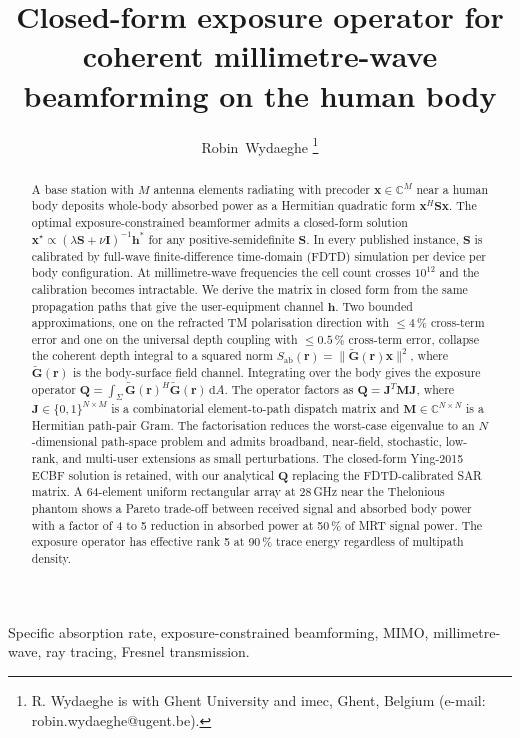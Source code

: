 \documentclass[journal,twocolumn,10pt]{IEEEtran}
\title{Closed-form exposure operator for coherent millimetre-wave
  beamforming on the human body}
\author{Robin~Wydaeghe%
  \thanks{R. Wydaeghe is with Ghent University and imec, Ghent, Belgium
  (e-mail: robin.wydaeghe@ugent.be).}}
\theoremstyle{plain}
\theoremstyle{remark}
\newcommand{\rr}{\mathbf{r}}
\newcommand{\xx}{\mathbf{x}}
\newcommand{\hh}{\mathbf{h}}
\newcommand{\Sab}{S_{\mathrm{ab}}}
\newcommand{\Gtil}{\tilde{\mathbf{G}}}
\newcommand{\Qmat}{\mathbf{Q}}
\newcommand{\Mmat}{\mathbf{M}}
\newcommand{\Jmat}{\mathbf{J}}
\newcommand{\diff}{\mathrm{d}}
\newcommand{\Complex}{\mathbb{C}}
\begin{document}
\maketitle

\begin{abstract}
A base station with $M$ antenna elements radiating with precoder
$\xx \in \Complex^M$ near a human body deposits whole-body absorbed
power as a Hermitian quadratic form $\xx^H \mathbf{S} \xx$. The
optimal exposure-constrained beamformer admits a closed-form solution
$\xx^\star \propto (\lambda \mathbf{S} + \nu \mathbf{I})^{-1} \hh^*$
for any positive-semidefinite $\mathbf{S}$. In every published
instance, $\mathbf{S}$ is calibrated by full-wave finite-difference
time-domain (FDTD) simulation per device per body configuration. At
millimetre-wave frequencies the cell count crosses $10^{12}$ and the
calibration becomes intractable. We derive the matrix in closed form
from the same propagation paths that give the user-equipment
channel $\hh$. Two bounded approximations, one on the refracted TM
polarisation direction with $\leq 4\,\%$ cross-term error and one on
the universal depth coupling with $\leq 0.5\,\%$ cross-term error,
collapse the coherent depth integral to a squared norm
$\Sab(\rr) = \|\Gtil(\rr)\xx\|^2$, where $\Gtil(\rr)$ is the
body-surface field channel. Integrating over the body gives the
exposure operator
$\Qmat = \int_\Sigma \Gtil(\rr)^H \Gtil(\rr)\,\diff A$. The operator
factors as $\Qmat = \Jmat^T \Mmat \Jmat$, where
$\Jmat \in \{0,1\}^{N \times M}$ is a combinatorial element-to-path
dispatch matrix and $\Mmat \in \Complex^{N \times N}$ is a Hermitian
path-pair Gram. The factorisation reduces the worst-case eigenvalue
to an $N$-dimensional path-space problem and admits broadband,
near-field, stochastic, low-rank, and multi-user extensions as small
perturbations. The closed-form Ying-2015 ECBF solution is retained,
with our analytical $\Qmat$ replacing the FDTD-calibrated SAR matrix.
A 64-element uniform rectangular array at 28\,GHz near the Thelonious
phantom shows a Pareto trade-off between received signal and absorbed
body power with a factor of 4 to 5 reduction in absorbed power at
50\,\% of MRT signal power. The exposure operator has effective rank
5 at 90\,\% trace energy regardless of multipath density.
\end{abstract}

\begin{IEEEkeywords}
Specific absorption rate, exposure-constrained beamforming, MIMO,
millimetre-wave, ray tracing, Fresnel transmission.
\end{IEEEkeywords}
\end{document}
